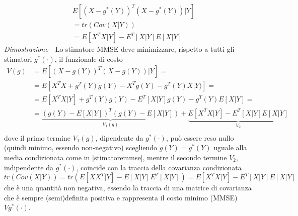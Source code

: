 \begin{equation}
\begin{split}
&E[(X-g^*(Y))^T(X-g^*(Y))|Y]\\
&=tr(Cov(X|Y)) \\
&=E[X^TX|Y]-E^T[X|Y]E[X|Y]
\end{split}
\end{equation}
\textit{Dimostrazione} - Lo stimatore MMSE deve minimizzare, rispetto a tutti gli stimatori $g^*(\cdot)$, il funzionale di costo\\
\begin{equation}
\begin{split}
V(g)&=E[(X-g(Y))^T(X-g(Y))|Y]= \\
&=E[X^TX+g^T(Y)g(Y)-X^Tg(Y)-g^T(Y)X|Y)]= \\
&=E[X^TX|Y]+g^T(Y)g(Y)-E^T[X|Y]g(Y)-g^T(Y)E[X|Y]=\\
&=\underbrace{(g(Y)-E[X|Y])^T(g(Y)-E[X|Y])}_{V_1(g)}+\underbrace{E[X^TX|Y]-E^T[X|Y]E[X|Y]}_{V_2}\\
\end{split}
\end{equation}
dove il primo termine $V_1(g)$, dipendente da $g^*(\cdot)$, può essere reso nullo (quindi minimo, essendo non-negativo) scegliendo $g(Y)=g^*(Y)$ uguale alla media condizionata come in \eqref{stimatoremmse}, mentre il secondo termine $V_2$, indipendente da $g^*(\cdot)$, coincide con la traccia della covarianza condizionata $tr(Cov(X|Y))=tr(E[XX^T|Y]-E[X|Y]E^T[X|Y])=E[X^TX|Y]-E^T[X|Y]E[X|Y]$ che è una quantità non negativa, essendo la traccia di una matrice di covarianza che è sempre (semi)definita positiva e rappresenta il costo minimo (MMSE) $Vg^*(\cdot)$.\\

